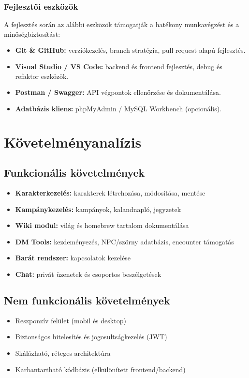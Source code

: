 \documentclass[colorlinks]{thesis-kando}
\theoremstyle{definition}
\theoremstyle{remark}
\begin{document}
	\subsection{Fejlesztői eszközök}
	A fejlesztés során az alábbi eszközök támogatják a hatékony munkavégzést és a minőségbiztosítást:
	\begin{itemize}
		\item \textbf{Git \& GitHub:} verziókezelés, branch stratégia, pull request alapú fejlesztés.
		\item \textbf{Visual Studio / VS Code:} backend és frontend fejlesztés, debug és refaktor eszközök.
		\item \textbf{Postman / Swagger:} API végpontok ellenőrzése és dokumentálása.
		\item \textbf{Adatbázis kliens:} phpMyAdmin / MySQL Workbench (opcionális).
	\end{itemize}
	
	\chapter{Követelményanalízis}
	
	\section{Funkcionális követelmények}
	\begin{itemize}
		\item \textbf{Karakterkezelés:} karakterek létrehozása, módosítása, mentése
		\item \textbf{Kampánykezelés:} kampányok, kalandnapló, jegyzetek
		\item \textbf{Wiki modul:} világ és homebrew tartalom dokumentálása
		\item \textbf{DM Tools:} kezdeményezés, NPC/szörny adatbázis, encounter támogatás
		\item \textbf{Barát rendszer:} kapcsolatok kezelése
		\item \textbf{Chat:} privát üzenetek és csoportos beszélgetések
	\end{itemize}
	
	\section{Nem funkcionális követelmények}
	\begin{itemize}
		\item Reszponzív felület (mobil és desktop)
		\item Biztonságos hitelesítés és jogosultságkezelés (JWT)
		\item Skálázható, réteges architektúra
		\item Karbantartható kódbázis (elkülönített frontend/backend)
	\end{itemize}
	
\end{document}
